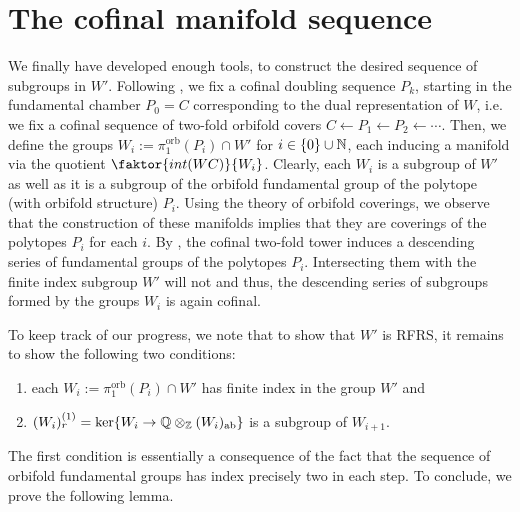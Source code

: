 \newpage
\section{The cofinal manifold sequence}

We finally have developed enough tools, to construct the desired sequence of subgroups in \(W'\).
Following , we fix a cofinal doubling sequence \(P_k\), starting in the fundamental chamber \(P_0 = C\) corresponding to the dual representation of \(W\), i.e. we fix a cofinal sequence of two-fold orbifold covers \(C \leftarrow P_1 \leftarrow P_2 \leftarrow \cdots\).
Then, we define the groups \(W_i := \pi_1^{\text{orb}}(P_i) \cap W'\) for \(i \in \{0\} \cup \mathbb{N}\), each inducing a manifold via the quotient \(\faktor{int(WC)}{W_i}\).
Clearly, each \(W_i\) is a subgroup of \(W'\) as well as it is a subgroup of the orbifold fundamental group of the polytope (with orbifold structure) \(P_i\).
Using the theory of orbifold coverings, we observe that the construction of these manifolds implies that they are coverings of the polytopes \(P_i\) for each \(i\). %
By , the cofinal two-fold tower induces a descending series of fundamental groups of the polytopes \(P_i\).
Intersecting them with the finite index subgroup \(W'\) will not  and thus, the descending series of subgroups formed by the groups \(W_i\) is again cofinal.

\noindent
To keep track of our progress, we note that to show that \(W'\) is RFRS, it remains to show the following two conditions:
\begin{enumerate}
    \item each \(W_i := \pi_1^{\text{orb}}(P_i) \cap W'\) has finite index in the group \(W'\) and
    \item \((W_i)_r^{(1)} = \ker\{W_i \to \mathbb{Q} \otimes_{\mathbb{Z}} (W_i)_{\text{ab}}\}\) is a subgroup of \(W_{i+1}\).
\end{enumerate}
The first condition is essentially a consequence of the fact that the sequence of orbifold fundamental groups has index precisely two in each step.
To conclude, we prove the following lemma.

